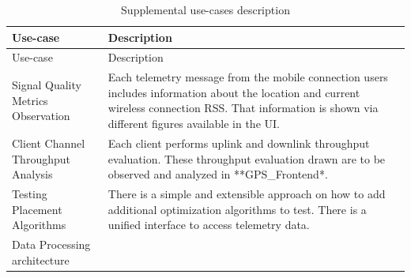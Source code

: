 \begin{longtable}[]{@{}ll@{}}
	\caption{Supplemental use-cases description}\tabularnewline
	\toprule
	\begin{minipage}[b]{0.31\columnwidth}\raggedright
		Use-case\strut
	\end{minipage} & \begin{minipage}[b]{0.63\columnwidth}\raggedright
		Description\strut
	\end{minipage}\tabularnewline
	\midrule
	\endfirsthead
	\toprule
	\begin{minipage}[b]{0.31\columnwidth}\raggedright
		Use-case\strut
	\end{minipage} & \begin{minipage}[b]{0.63\columnwidth}\raggedright
		Description\strut
	\end{minipage}\tabularnewline
	\midrule
	\endhead
	\begin{minipage}[t]{0.31\columnwidth}\raggedright
		Signal Quality Metrics Observation\strut
	\end{minipage} & \begin{minipage}[t]{0.63\columnwidth}\raggedright
		Each telemetry message from the mobile connection users includes
		information about the location and current wireless connection RSS. That
		information is shown via different figures available in the UI.\strut
	\end{minipage}\tabularnewline
	\begin{minipage}[t]{0.31\columnwidth}\raggedright
		Client Channel Throughput Analysis\strut
	\end{minipage} & \begin{minipage}[t]{0.63\columnwidth}\raggedright
		Each client performs uplink and downlink throughput evaluation. These
		throughput evaluation drawn are to be observed and analyzed in
		**GPS\_Frontend*.\strut
	\end{minipage}\tabularnewline
	\begin{minipage}[t]{0.31\columnwidth}\raggedright
		Testing Placement Algorithms\strut
	\end{minipage} & \begin{minipage}[t]{0.63\columnwidth}\raggedright
		There is a simple and extensible approach on how to add additional
		optimization algorithms to test. There is a unified interface to access
		telemetry data.\strut
	\end{minipage}\tabularnewline
	\begin{minipage}[t]{0.31\columnwidth}\raggedright
		Data Processing architecture\strut

\end{minipage}
\end{longtable}
